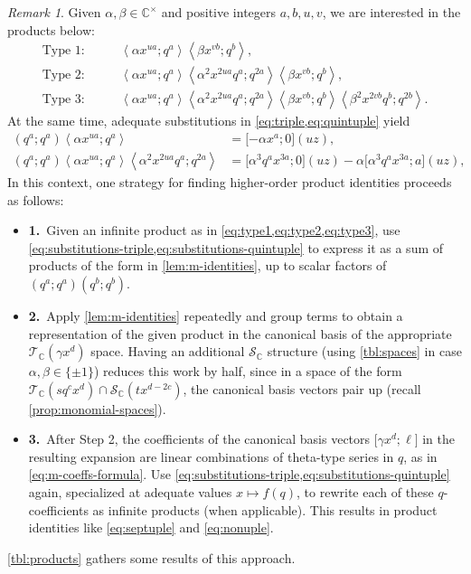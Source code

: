 \documentclass[reqno,11pt]{amsart}
\theoremstyle{definition}
\theoremstyle{remark}
\newtheorem*{remark}{Remark}
\numberwithin{equation}{section}
\newcommand{\C}{\mathbb{C}}
\newcommand{\mT}{\mathcal{T}}
\newcommand{\mS}{\mathcal{S}}
\newcommand{\la}{\left\langle}
\newcommand{\ra}{\right\rangle}
\newcommand{\vect}[2]{\big[{#1};{#2}\big]}
\begin{document}
\begin{remark}
Given $\alpha, \beta \in \C^\times$ and positive integers $a, b, u, v$, we are interested in the products below:
\begin{align}
    \label{eq:type1}
    \text{Type 1:}\qquad
    &\la \alpha x^{u a}; q^a \ra \la \beta x^{v b}; q^b \ra,
    \\
    \label{eq:type2}
    \text{Type 2:}\qquad
    &\la \alpha x^{u a}; q^a \ra \la \alpha^2 x^{2u a}q^a; q^{2a} \ra \la \beta x^{v b}; q^b \ra ,
    \\
    \label{eq:type3}
    \text{Type 3:}\qquad
    &\la \alpha x^{u a}; q^a \ra \la \alpha^2 x^{2u a}q^a; q^{2a} \ra \la \beta x^{v b}; q^b \ra \la \beta^2 x^{2v b} q^b; q^{2b} \ra.
\end{align}
At the same time, adequate substitutions in \cref{eq:triple,eq:quintuple} yield
\begin{align} \label{eq:substitutions-triple}
    \left(q^a; q^a\right)\la \alpha x^{u a}; q^a \ra 
    &= 
    \vect{-\alpha x^a}{0}(uz),
    \\
    \label{eq:substitutions-quintuple}
    \left(q^a; q^a\right) \la \alpha x^{u a}; q^a \ra \la \alpha^2 x^{2u a}q^a; q^{2a} \ra 
    &=
    \vect{\alpha^3 q^a x^{3a}}{0}(uz) 
    - 
    \alpha \vect{\alpha^3 q^a x^{3a}}{a}(uz),
\end{align}
In this context, one strategy for finding higher-order product identities proceeds as follows:
\begin{itemize}
\item[\textbf{Step}]\textbf{1.}\ Given an infinite product as in \cref{eq:type1,eq:type2,eq:type3}, use \cref{eq:substitutions-triple,eq:substitutions-quintuple} to express it as a sum of products of the form in \cref{lem:m-identities}, up to scalar factors of $\left(q^a; q^a\right)\left(q^b; q^b\right)$.

\item[\textbf{Step}]\textbf{2.}\ Apply \cref{lem:m-identities} repeatedly and group terms to obtain a representation of the given product in the canonical basis of the appropriate $\mT_\C\left(\gamma x^d\right)$ space. Having an additional $\mS_\C$ structure (using \cref{tbl:spaces} in case $\alpha, \beta \in \{\pm 1\}$) reduces this work by half, since in a space of the form $\mT_\C\left(s q^c x^d\right) \cap \mS_\C\left(t x^{d-2c}\right)$, the canonical basis vectors pair up (recall \cref{prop:monomial-spaces}).

\item[\textbf{Step}]\textbf{3.}\ After Step 2, the coefficients of the canonical basis vectors $\vect{\gamma x^d}{\ell}$ in the resulting expansion are linear combinations of theta-type series in $q$, as in \cref{eq:m-coeffs-formula}.
Use \cref{eq:substitutions-triple,eq:substitutions-quintuple} again, specialized at adequate values $x \mapsto f(q)$, to rewrite each of these $q$-coefficients as infinite products (when applicable). This results in product identities like \cref{eq:septuple} and \cref{eq:nonuple}.
\end{itemize}
\cref{tbl:products} gathers some results of this approach. 
\end{remark}
\end{document}
